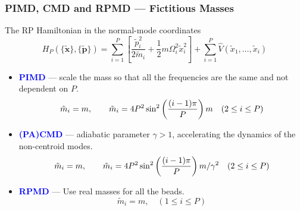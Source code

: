 \begin{frame}
  \frametitle{PIMD, CMD and RPMD --- Fictitious Masses}
  The RP Hamiltonian in the normal-mode coordinates
  \begin{equation*}
    H_P(\{\mathbf{\tilde{x}}\}, \{\mathbf{\tilde{p}}\}) =
    \sum_{i=1}^P
    \left[
      \frac{\tilde{p}_i^2}{2\tilde{m}_i}
      +
      \frac{1}{2} m \Omega_i^2 \tilde{x}_i^2
    \right]
      +
      \sum_{i=1}^P 
      \hat{V}(\tilde{x}_1,\ldots,\tilde{x}_i)
  \end{equation*}
  \medskip
  \begin{itemize}
  \item \textcolor{blue}{\textbf{PIMD}} --- scale the mass so that all the frequencies are the
    same and not dependent on $P$.
    \begin{equation*}
      \tilde{m}_i = m, \qquad \tilde{m}_i = 4P^2\sin^2\left({(i-1)\pi\over
          P}\right) m \quad (2 \le i \le P)
    \end{equation*}
  \item \textcolor{blue}{\textbf{(PA)CMD}} --- adiabatic parameter $\gamma > 1$, accelerating the dynamics of the non-centroid modes.
    \begin{equation*}
      \tilde{m}_i = m, \qquad \tilde{m}_i = 4P^2\sin^2\left({(i-1)\pi\over
          P}\right) m / \gamma^2 \quad (2 \le i \le P)
    \end{equation*}
  \item \textcolor{blue}{\textbf{RPMD}} --- Use real masses for all the beads.
    \begin{equation*}
      \tilde{m}_i = m, \quad (1 \le i \le P)
    \end{equation*}
  \end{itemize}
\end{frame}

